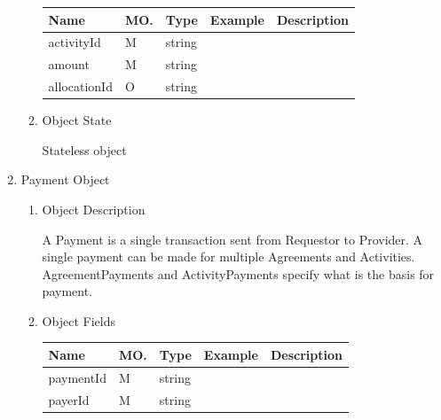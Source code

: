 \begin{enumerate}
\begin{enumerate}
\begin{table}[H]
\footnotesize

\begin{center}
\begin{tabular}{|p{3cm}|l|p{3cm}|p{3cm}|p{4cm}|} 
\hline
\rowcolor{lightgray}	Name	& MO.	& Type	& Example & 	Description \\
\hline

activityId		& M & string				&							& 							\\
\hline

amount			& M & string				&							& 							\\
\hline

allocationId	& O & string				&							& 							\\
\hline

\end{tabular}
\end{center}
\end{table}

\item Object State

Stateless object

\end{enumerate}

\item Payment Object

\begin{enumerate}

\item Object Description

A Payment is a single transaction sent from Requestor to Provider. 
A single payment can be made for multiple Agreements and Activities. 
AgreementPayments and ActivityPayments specify what is the basis for payment.

\item Object Fields

\begin{table}[H]
\footnotesize

\begin{center}
\begin{tabular}{|p{3cm}|l|p{3cm}|p{3cm}|p{4cm}|} 
\hline
\rowcolor{lightgray}	Name	& MO.	& Type	& Example & 	Description \\
\hline

paymentId			& M & string				&							&							\\
\hline

payerId				& M & string				&							&							\\
\hline


\end{tabular}
\end{center}
\end{table}
\end{enumerate}
\end{enumerate}
